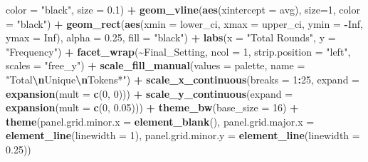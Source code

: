 \documentclass[
]{article}
\newenvironment{Shaded}{\begin{snugshade}}{\end{snugshade}}
\newcommand{\AttributeTok}[1]{\textcolor[rgb]{0.13,0.29,0.53}{#1}}
\newcommand{\ConstantTok}[1]{\textcolor[rgb]{0.56,0.35,0.01}{#1}}
\newcommand{\DecValTok}[1]{\textcolor[rgb]{0.00,0.00,0.81}{#1}}
\newcommand{\FloatTok}[1]{\textcolor[rgb]{0.00,0.00,0.81}{#1}}
\newcommand{\FunctionTok}[1]{\textcolor[rgb]{0.13,0.29,0.53}{\textbf{#1}}}
\newcommand{\NormalTok}[1]{#1}
\newcommand{\SpecialCharTok}[1]{\textcolor[rgb]{0.81,0.36,0.00}{\textbf{#1}}}
\newcommand{\StringTok}[1]{\textcolor[rgb]{0.31,0.60,0.02}{#1}}
\begin{document}
\begin{Shaded}
\begin{Highlighting}[]
                 \AttributeTok{color =} \StringTok{"black"}\NormalTok{,}
                 \AttributeTok{size =} \FloatTok{0.1}\NormalTok{) }\SpecialCharTok{+}
  \FunctionTok{geom\_vline}\NormalTok{(}\FunctionTok{aes}\NormalTok{(}\AttributeTok{xintercept =}\NormalTok{ avg), }\AttributeTok{size=}\DecValTok{1}\NormalTok{, }\AttributeTok{color =} \StringTok{"black"}\NormalTok{) }\SpecialCharTok{+}
  \FunctionTok{geom\_rect}\NormalTok{(}\FunctionTok{aes}\NormalTok{(}\AttributeTok{xmin =}\NormalTok{ lower\_ci, }\AttributeTok{xmax =}\NormalTok{ upper\_ci, }\AttributeTok{ymin =} \SpecialCharTok{{-}}\ConstantTok{Inf}\NormalTok{, }\AttributeTok{ymax =} \ConstantTok{Inf}\NormalTok{), }\AttributeTok{alpha =} \FloatTok{0.25}\NormalTok{, }\AttributeTok{fill =} \StringTok{"black"}\NormalTok{) }\SpecialCharTok{+}
  \FunctionTok{labs}\NormalTok{(}\AttributeTok{x =} \StringTok{"Total Rounds"}\NormalTok{, }
       \AttributeTok{y =} \StringTok{"Frequency"}\NormalTok{) }\SpecialCharTok{+}
  \FunctionTok{facet\_wrap}\NormalTok{(}\SpecialCharTok{\textasciitilde{}}\NormalTok{Final\_Setting, }\AttributeTok{ncol =} \DecValTok{1}\NormalTok{, }\AttributeTok{strip.position =} \StringTok{"left"}\NormalTok{, }\AttributeTok{scales =} \StringTok{"free\_y"}\NormalTok{) }\SpecialCharTok{+}
  \FunctionTok{scale\_fill\_manual}\NormalTok{(}\AttributeTok{values =}\NormalTok{ palette, }\AttributeTok{name =} \StringTok{"Total}\SpecialCharTok{\textbackslash{}n}\StringTok{Unique}\SpecialCharTok{\textbackslash{}n}\StringTok{Tokens*"}\NormalTok{) }\SpecialCharTok{+}
  \FunctionTok{scale\_x\_continuous}\NormalTok{(}\AttributeTok{breaks =} \DecValTok{1}\SpecialCharTok{:}\DecValTok{25}\NormalTok{, }\AttributeTok{expand =} \FunctionTok{expansion}\NormalTok{(}\AttributeTok{mult =} \FunctionTok{c}\NormalTok{(}\DecValTok{0}\NormalTok{, }\DecValTok{0}\NormalTok{))) }\SpecialCharTok{+}
  \FunctionTok{scale\_y\_continuous}\NormalTok{(}\AttributeTok{expand =} \FunctionTok{expansion}\NormalTok{(}\AttributeTok{mult =} \FunctionTok{c}\NormalTok{(}\DecValTok{0}\NormalTok{, }\FloatTok{0.05}\NormalTok{))) }\SpecialCharTok{+}
  \FunctionTok{theme\_bw}\NormalTok{(}\AttributeTok{base\_size =} \DecValTok{16}\NormalTok{) }\SpecialCharTok{+}
  \FunctionTok{theme}\NormalTok{(}\AttributeTok{panel.grid.minor.x =} \FunctionTok{element\_blank}\NormalTok{(),}
        \AttributeTok{panel.grid.major.x =} \FunctionTok{element\_line}\NormalTok{(}\AttributeTok{linewidth =} \DecValTok{1}\NormalTok{),}
        \AttributeTok{panel.grid.minor.y =} \FunctionTok{element\_line}\NormalTok{(}\AttributeTok{linewidth =} \FloatTok{0.25}\NormalTok{))}
\end{Highlighting}
\end{Shaded}
\end{document}
